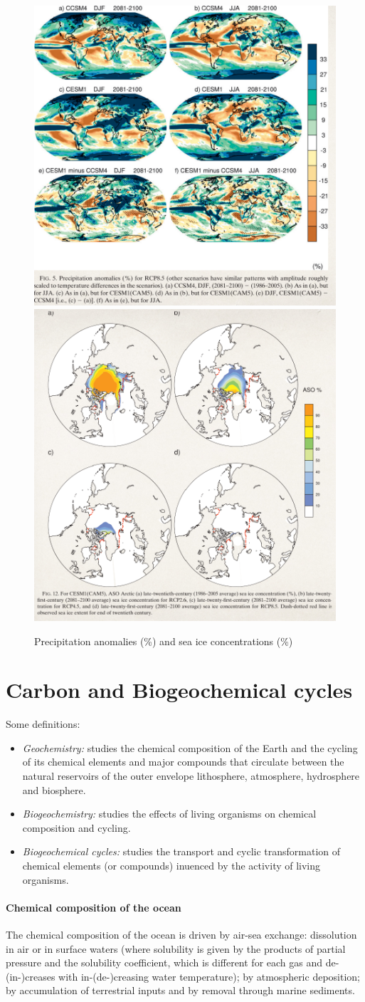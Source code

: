 \begin{figure}[htpb]
	\centering
	\includegraphics[width=0.35\linewidth]{uploads/precipitations.png}\quad \includegraphics[width=0.35\linewidth]{uploads/sea ice.png}
	\caption{Precipitation anomalies (\%) and sea ice concentrations (\%)}

\end{figure}

\section{Carbon and Biogeochemical cycles}
Some definitions:
\begin{itemize}
	\item \textit{Geochemistry:} studies the chemical composition of the Earth and the cycling of its chemical elements and major compounds that circulate between the natural reservoirs of the outer envelope lithosphere, atmosphere, hydrosphere and biosphere.
	\item \textit{Biogeochemistry: } studies the effects of living organisms on chemical composition and cycling.
	\item \textit{Biogeochemical cycles:} studies the transport and cyclic transformation of chemical elements (or compounds) inuenced by the activity of living organisms.
\end{itemize}
\paragraph{Chemical composition of the ocean} The chemical composition of the ocean is driven by air-sea exchange: dissolution in air or in surface waters (where solubility is given by the products of partial pressure and the solubility coefficient, which is different for each gas and de-(in-)creases with in-(de-)creasing water temperature); by atmospheric deposition; by accumulation of terrestrial inputs and by removal through marine sediments.

